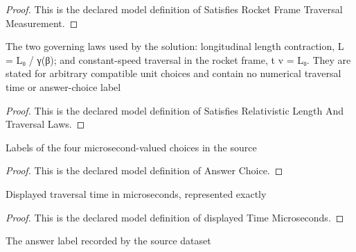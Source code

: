 \begin{proof}
  This is the declared model definition of Satisfies Rocket Frame Traversal Measurement.
\end{proof}
\begin{definition}
  \label{def:physics:phyx-mini-0552:phyxminiproblems-problemphyxmini0552-satisfiesrelativisticlengthandtraversallaws}
  The two governing laws used by the solution: longitudinal length contraction, L = L₀ / γ(β); and constant-speed traversal in the rocket frame, t v = L₀. They are stated for arbitrary compatible unit choices and contain no numerical traversal time or answer-choice label
\end{definition}
\begin{proof}
  This is the declared model definition of Satisfies Relativistic Length And Traversal Laws.
\end{proof}
\begin{definition}
  \label{def:physics:phyx-mini-0552:phyxminiproblems-problemphyxmini0552-answerchoice}
  Labels of the four microsecond-valued choices in the source
\end{definition}
\begin{proof}
  This is the declared model definition of Answer Choice.
\end{proof}
\begin{definition}
  \label{def:physics:phyx-mini-0552:phyxminiproblems-problemphyxmini0552-displayedtimemicroseconds}
  Displayed traversal time in microseconds, represented exactly
\end{definition}
\begin{proof}
  This is the declared model definition of displayed Time Microseconds.
\end{proof}
\begin{definition}
  \label{def:physics:phyx-mini-0552:phyxminiproblems-problemphyxmini0552-recordeddatasetanswer}
  The answer label recorded by the source dataset
\end{definition}
